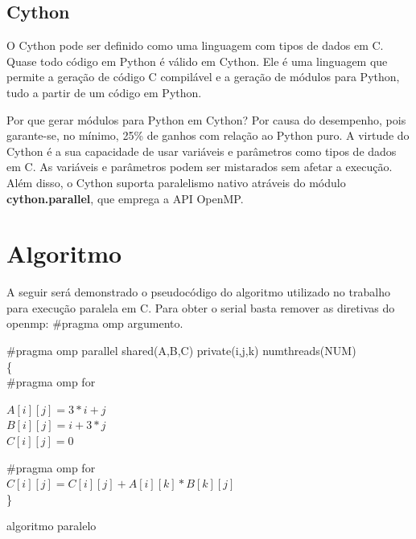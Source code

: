\documentclass[a4paper,12pt]{article}
\begin{document}
\subsection{Cython}
O Cython pode ser definido como uma linguagem com tipos de dados em C. Quase todo código em Python é válido em Cython. Ele é uma linguagem que permite a geração de código C compilável e a geração de módulos para Python, tudo a partir de um código em Python. 

Por que gerar módulos para Python em Cython? Por causa do desempenho, pois garante-se, no mínimo, 25\% de ganhos com relação ao Python puro. A virtude do Cython é a sua capacidade de usar variáveis e parâmetros como tipos de dados em C. As variáveis e parâmetros podem ser mistarados sem afetar a execução. Além disso, o Cython suporta paralelismo nativo atráveis do módulo {\bf cython.parallel}, que emprega a API OpenMP. 

\section{Algoritmo}
A seguir será demonstrado o pseudocódigo do algoritmo utilizado no trabalho para execução paralela em C. Para obter o serial basta remover as diretivas do openmp: \#pragma omp argumento. 

\begin{algorithm}[!htb]
   \SetAlgoLined   
   \Inicio
   { 
       \#pragma omp parallel shared(A,B,C) private(i,j,k) num\underline{\space}threads(NUM) \\
       \{\\
        \#pragma omp for\\
        {
            {
                $A[i][j] = 3 \ast  i +  j$\\
        				$B[i][j] = i +  3 \ast  j$\\
	    	    		$C[i][j] = 0$\\
            }  
            
            
        }
        
        \#pragma omp for\\
        {
            {
                {
                   $C[i][j] = C[i][j] + A[i][k] \ast  B[k][j]$\\
                }
            }
        }
      \}
    
   }
   \label{alg:MxM}
   \caption{algoritmo paralelo}
\end{algorithm}
\end{document}
